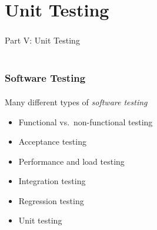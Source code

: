 \documentclass[]{beamer}
\begin{document}
\section{Unit Testing}

\begin{frame}
    \frametitle{}
    \framesubtitle{}
    
    \begin{center}
    {\Huge Part V: Unit Testing}\\
    {\Large ~}
    \end{center}

\end{frame}

\begin{frame}
    \frametitle{Software Testing}
    \framesubtitle{}

Many different types of \emph{software testing}

\begin{itemize}[<+->]
  \item Functional vs.\ non-functional testing %
  \item Acceptance testing
  \item Performance and load testing
  \item Integration testing
  \item Regression testing
  \item Unit testing
\end{itemize}

\end{frame}
\end{document}
